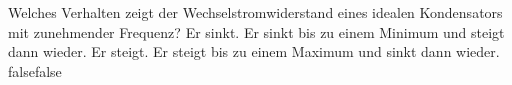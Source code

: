     {Welches Verhalten zeigt der Wechselstromwiderstand eines idealen Kondensators mit zunehmender Frequenz?}
    {Er sinkt.}
    {Er sinkt bis zu einem Minimum und steigt dann wieder.}
    {Er steigt.}
    {Er steigt bis zu einem Maximum und sinkt dann wieder.}
    {false}{false}